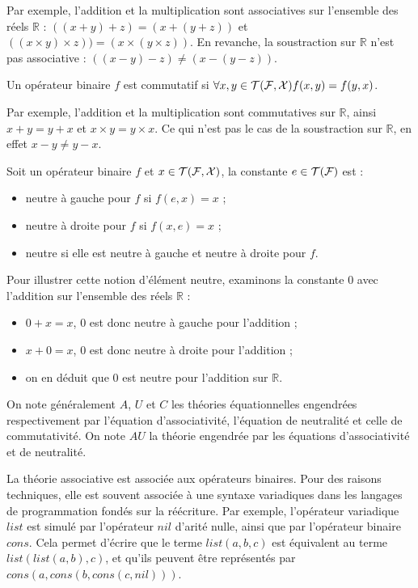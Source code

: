 Par exemple, l'addition et la multiplication sont associatives sur l'ensemble
des réels $\mathbb{R}$ : $((x+y)+z) = (x+(y+z))$ et $((x\times y)\times z)) =
(x\times (y\times z))$. En revanche, la soustraction sur $\mathbb{R}$ n'est pas
associative : $((x-y)-z) \neq (x-(y-z))$.

\begin{definition}
  Un opérateur binaire $f$ est commutatif si $\forall x,y \in \mathcal{T}(\mathcal{F},\mathcal{X}) f(x,y) =
  f(y,x)$.
\end{definition}

Par exemple, l'addition et la multiplication sont commutatives sur
$\mathbb{R}$, ainsi $x+y = y+x$ et $x\times y = y\times x$. Ce qui n'est pas le
cas de la soustraction sur $\mathbb{R}$, en effet $x-y \neq y-x$.

\begin{definition}
Soit un opérateur binaire $f$ et $x \in \mathcal{T}(\mathcal{F},\mathcal{X})$, la constante $e \in \mathcal{T}(\mathcal{F})$ est :
\begin{itemize}
  \item neutre à gauche pour $f$ si $f(e,x) = x$ ;
  \item neutre à droite pour $f$ si $f(x,e) = x$ ;
  \item neutre si elle est neutre à gauche et neutre à droite pour $f$.
\end{itemize} 
\end{definition}
Pour illustrer cette notion d'élément neutre, examinons la constante 0 avec
l'addition sur l'ensemble des réels $\mathbb{R}$ :
\begin{itemize}
  \item $0+x = x$, 0 est donc neutre à gauche pour l'addition ; 
  \item $x+0 = x$, 0 est donc neutre à droite pour l'addition ;
  \item on en déduit que 0 est neutre pour l'addition sur $\mathbb{R}$.
\end{itemize}

On note généralement $A$, $U$ et $C$ les théories équationnelles engendrées
respectivement par l'équation d'associativité, l'équation de neutralité et
celle de commutativité. On note $AU$ la théorie engendrée par les équations
d'associativité et de neutralité.

La théorie associative est associée aux opérateurs binaires. Pour des raisons
techniques, elle est souvent associée à une syntaxe variadiques dans les
langages de programmation fondés sur la réécriture. Par exemple, l'opérateur
variadique $list$ est simulé par l'opérateur $nil$ d'arité nulle, ainsi que par
l'opérateur binaire $cons$. Cela permet d'écrire que le terme $list(a,b,c)$ est
équivalent au terme $list(list(a,b),c)$, et qu'ils peuvent être représentés par
$cons(a,cons(b,cons(c,nil)))$.

